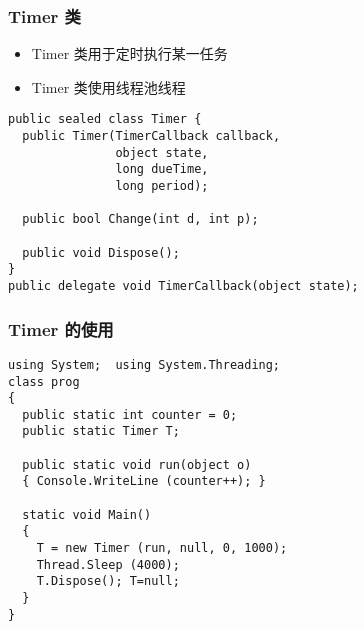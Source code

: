 \begin{frame}[fragile]
\frametitle{Timer 类}
\begin{itemize}
\item Timer 类用于定时执行某一任务
\item Timer 类使用线程池线程
\end{itemize}
\begin{lstlisting}
public sealed class Timer {
  public Timer(TimerCallback callback,
               object state,
               long dueTime, 
               long period);

  public bool Change(int d, int p);

  public void Dispose();
}
public delegate void TimerCallback(object state);
\end{lstlisting}
\end{frame}

\begin{frame}[fragile]
\frametitle{Timer 的使用}
\begin{lstlisting}
using System;  using System.Threading;
class prog
{
  public static int counter = 0;
  public static Timer T;

  public static void run(object o)
  { Console.WriteLine (counter++); }

  static void Main()
  {
    T = new Timer (run, null, 0, 1000);
    Thread.Sleep (4000);
    T.Dispose(); T=null;
  }
}
\end{lstlisting}
\end{frame}


